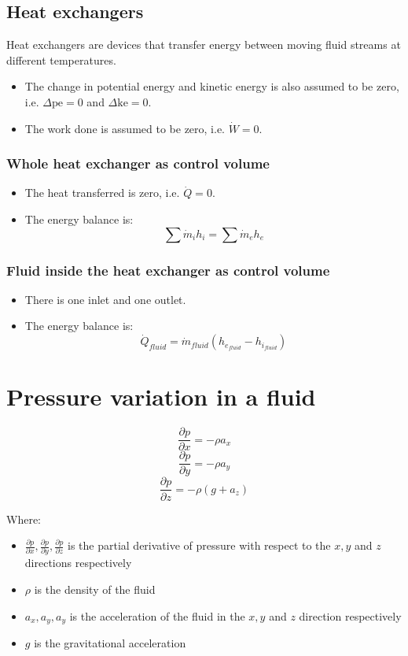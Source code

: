 \documentclass[11pt]{article}
\begin{document}
\subsection{Heat exchangers}
\label{sec:orgbd7e1b1}
Heat exchangers are devices that transfer energy between moving fluid streams at different temperatures.
\begin{itemize}
\item The change in potential energy and kinetic energy is also assumed to be zero, i.e. \(\Delta \text{pe} = 0\) and \(\Delta \text{ke} = 0\).
\item The work done is assumed to be zero, i.e. \(\dot{W} = 0\).
\end{itemize}

\subsubsection{Whole heat exchanger as control volume}
\label{sec:org3a8fef2}
\begin{itemize}
\item The heat transferred is zero, i.e. \(\dot{Q} = 0\).
\item The energy balance is:
\[\sum \dot{m}_i h_i = \sum \dot{m}_e h_e\]
\end{itemize}

\subsubsection{Fluid inside the heat exchanger as control volume}
\label{sec:org9154400}
\begin{itemize}
\item There is one inlet and one outlet.
\item The energy balance is:
\[\dot{Q}_{fluid} = \dot{m}_{fluid} \left(h_{e_{fluid}} - h_{i_{fluid}} \right)\]
\end{itemize}


\section{Pressure variation in a fluid}
\label{sec:org0fa6098}
\[\frac{\partial p}{\partial x} = - \rho a_x\]
\[\frac{\partial p}{\partial y} = - \rho a_y\]
\[\frac{\partial p}{\partial z} = - \rho (g + a_z)\]

Where:
\begin{itemize}
\item \(\frac{\partial p}{\partial x}, \frac{\partial p}{\partial y}, \frac{\partial p}{\partial z}\) is the partial derivative of pressure with respect to the \(x, y\) and \(z\) directions respectively
\item \(\rho\) is the density of the fluid
\item \(a_x, a_y, a_y\) is the acceleration of the fluid in the \(x, y\) and \(z\) direction respectively
\item \(g\) is the gravitational acceleration
\end{itemize}
\end{document}
